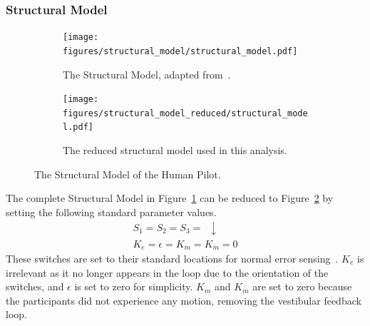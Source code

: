 \subsubsection{Structural Model}
\begin{figure}[tb]
    \centering
    \begin{subfigure}{\textwidth}
        \centering
        \texttt{[image: figures/structural\_model/structural\_model.pdf]}
        \caption[The Structural Model]{The Structural Model, adapted from~\citet{hess_unified_1997}.}
        \label{fig:structuralmodel}
    \end{subfigure}
    \hfill
    \begin{subfigure}{\textwidth}
        \centering
        \texttt{[image: figures/structural\_model\_reduced/structural\_model.pdf]}
        \caption[The reduced structural model used in this analysis]{The reduced structural model used in this analysis.}
        \label{fig:structuralmodelreduced}
    \end{subfigure}
    \caption[The Structural Model of the Human Pilot]{The Structural Model of the Human Pilot.}
    \label{fig:structuralmodels}
\end{figure}

The complete Structural Model in Figure~\ref{fig:structuralmodel} can be reduced to Figure~\ref{fig:structuralmodelreduced} by setting the following standard parameter values.
\begin{align}
    \nonumber    S_1 = S_2 = S_3 = \enspace \downarrow \\
    \nonumber    K_{\dot{e}} = \epsilon = K_{\dot{m}} = K_{\ddot{m}} = 0
\end{align}
These switches are set to their standard locations for normal error sensing~\citep{hess_unified_1997}.
$K_{\dot{e}}$ is irrelevant as it no longer appears in the loop due to the orientation of the switches, and $\epsilon$ is set to zero for simplicity.
$K_{\dot{m}}$ and $K_{\ddot{m}}$ are set to zero because the participants did not experience any motion, removing the vestibular feedback loop.

